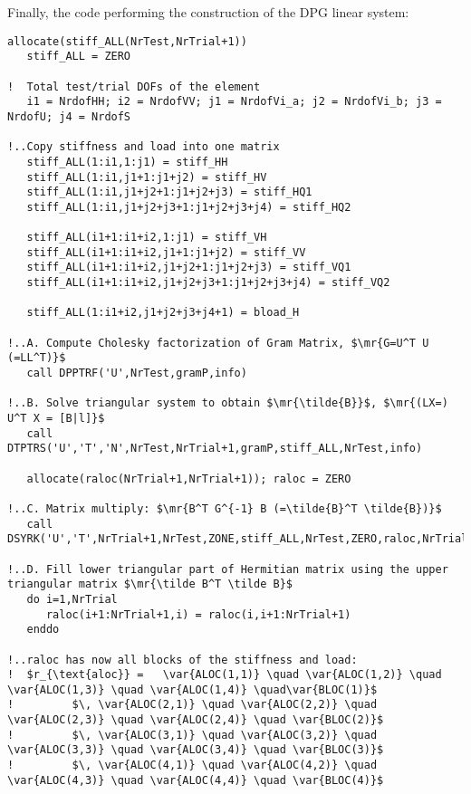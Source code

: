 Finally, the code performing the construction of the DPG linear system:
\begin{lstlisting}[mathescape,caption=\file{POISSON/ULTRAWEAK\_DPG/}\routine{elem}: constructing DPG linear system.]
   allocate(stiff_ALL(NrTest,NrTrial+1))
   stiff_ALL = ZERO

!  Total test/trial DOFs of the element
   i1 = NrdofHH; i2 = NrdofVV; j1 = NrdofVi_a; j2 = NrdofVi_b; j3 = NrdofU; j4 = NrdofS

!..Copy stiffness and load into one matrix
   stiff_ALL(1:i1,1:j1) = stiff_HH
   stiff_ALL(1:i1,j1+1:j1+j2) = stiff_HV
   stiff_ALL(1:i1,j1+j2+1:j1+j2+j3) = stiff_HQ1
   stiff_ALL(1:i1,j1+j2+j3+1:j1+j2+j3+j4) = stiff_HQ2

   stiff_ALL(i1+1:i1+i2,1:j1) = stiff_VH
   stiff_ALL(i1+1:i1+i2,j1+1:j1+j2) = stiff_VV
   stiff_ALL(i1+1:i1+i2,j1+j2+1:j1+j2+j3) = stiff_VQ1
   stiff_ALL(i1+1:i1+i2,j1+j2+j3+1:j1+j2+j3+j4) = stiff_VQ2

   stiff_ALL(1:i1+i2,j1+j2+j3+j4+1) = bload_H

!..A. Compute Cholesky factorization of Gram Matrix, $\mr{G=U^T U (=LL^T)}$
   call DPPTRF('U',NrTest,gramP,info)

!..B. Solve triangular system to obtain $\mr{\tilde{B}}$, $\mr{(LX=) U^T X = [B|l]}$
   call DTPTRS('U','T','N',NrTest,NrTrial+1,gramP,stiff_ALL,NrTest,info)

   allocate(raloc(NrTrial+1,NrTrial+1)); raloc = ZERO

!..C. Matrix multiply: $\mr{B^T G^{-1} B (=\tilde{B}^T \tilde{B})}$
   call DSYRK('U','T',NrTrial+1,NrTest,ZONE,stiff_ALL,NrTest,ZERO,raloc,NrTrial+1)

!..D. Fill lower triangular part of Hermitian matrix using the upper triangular matrix $\mr{\tilde B^T \tilde B}$
   do i=1,NrTrial
      raloc(i+1:NrTrial+1,i) = raloc(i,i+1:NrTrial+1)
   enddo
   
!..raloc has now all blocks of the stiffness and load:
!  $r_{\text{aloc}} =   \var{ALOC(1,1)} \quad \var{ALOC(1,2)} \quad \var{ALOC(1,3)} \quad \var{ALOC(1,4)} \quad\var{BLOC(1)}$
!         $\, \var{ALOC(2,1)} \quad \var{ALOC(2,2)} \quad \var{ALOC(2,3)} \quad \var{ALOC(2,4)} \quad \var{BLOC(2)}$
!         $\, \var{ALOC(3,1)} \quad \var{ALOC(3,2)} \quad \var{ALOC(3,3)} \quad \var{ALOC(3,4)} \quad \var{BLOC(3)}$
!         $\, \var{ALOC(4,1)} \quad \var{ALOC(4,2)} \quad \var{ALOC(4,3)} \quad \var{ALOC(4,4)} \quad \var{BLOC(4)}$
\end{lstlisting}
